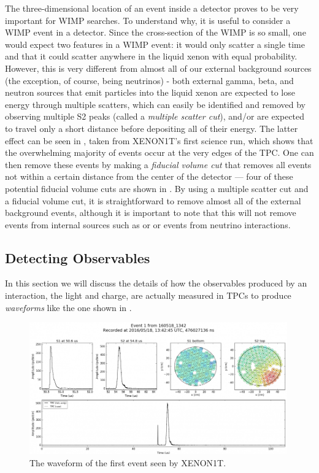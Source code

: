 The three-dimensional location of an event inside a detector proves to be very important for WIMP searches.  To understand why, it is useful to consider a WIMP event in a detector.  Since the cross-section of the WIMP is so small, one would expect two features in a WIMP event: it would only scatter a single time and that it could scatter anywhere in the liquid xenon with equal probability.  However, this is very different from almost all of our external background sources (the exception, of course, being neutrinos) - both external gamma, beta, and neutron sources that emit particles into the liquid xenon are expected to lose energy through multiple scatters, which can easily be identified and removed by observing multiple S2 peaks (called a \textit{multiple scatter cut}), and/or are expected to travel only a short distance before depositing all of their energy.  The latter effect can be seen in , taken from XENON1T's first science run, which shows that the overwhelming majority of events occur at the very edges of the TPC.  One can then remove these events by making a \textit{fiducial volume cut} that removes all events not within a certain distance from the center of the detector --- four of these potential fiducial volume cuts are shown in .  By using a multiple scatter cut and a fiducial volume cut, it is straightforward to remove almost all of the external background events, although it is important to note that this will not remove events from internal sources such as  or  or events from neutrino interactions.



\subsection{Detecting Observables}

In this section we will discuss the details of how the observables produced by an interaction, the light and charge, are actually measured in TPCs to produce \textit{waveforms} like the one shown in .

 \begin{figure}[t]
	\centering
	\includegraphics[width=0.99\textwidth]{tpc_waveform}
	\caption{The waveform of the first event seen by XENON1T.}
	\label{fig:tpc_waveform}
\end{figure}


